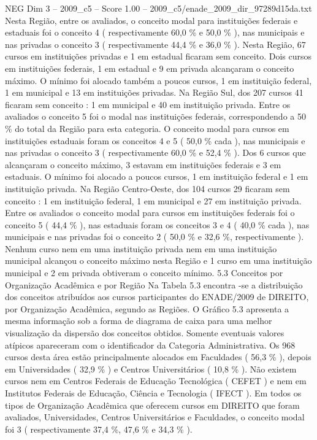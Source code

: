 \begin{textsample}{NEG Dim 3 – 2009\_c5 – Score 1.00 – 2009\_c5/enade\_2009\_dir\_97289d15da.txt}
Nesta Região, entre os avaliados, o conceito modal para instituições federais e estaduais foi o conceito 4 ( respectivamente 60,0 \% e 50,0 \% ), nas municipais e nas privadas o conceito 3 ( respectivamente 44,4 \% e 36,0 \% ).
Nesta Região, 67 cursos em instituições privadas e 1 em estadual ficaram sem conceito.
Dois cursos em instituições federais, 1 em estadual e 9 em privada alcançaram o conceito máximo.
O mínimo foi alocado também a poucos cursos, 1 em instituição federal, 1 em municipal e 13 em instituições privadas.
Na Região Sul, dos 207 cursos 41 ficaram sem conceito : 1 em municipal e 40 em instituição privada.
Entre os avaliados o conceito 5 foi o modal nas instituições federais, correspondendo a 50 \% do total da Região para esta categoria.
O conceito modal para cursos em instituições estaduais foram os conceitos 4 e 5 ( 50,0 \% cada ), nas municipais e nas privadas o conceito 3 ( respectivamente 60,0 \% e 52,4 \% ).
Dos 6 cursos que alcançaram o conceito máximo, 3 estavam em instituições federais e 3 em estaduais.
O mínimo foi alocado a poucos cursos, 1 em instituição federal e 1 em instituição privada.
Na Região Centro-Oeste, dos 104 cursos 29 ficaram sem conceito : 1 em instituição federal, 1 em municipal e 27 em instituição privada.
Entre os avaliados o conceito modal para cursos em instituições federais foi o conceito 5 ( 44,4 \% ), nas estaduais foram os conceitos 3 e 4 ( 40,0 \% cada ), nas municipais e nas privadas foi o conceito 2 ( 50,0 \% e 32,6 \%, respectivamente ).
Nenhum curso nem em uma instituição privada nem em uma instituição municipal alcançou o conceito máximo nesta Região e 1 curso em uma instituição municipal e 2 em privada obtiveram o conceito mínimo. 5.3 Conceitos por Organização Acadêmica e por Região Na Tabela 5.3 encontra -se a distribuição dos conceitos atribuídos aos cursos participantes do ENADE/2009 de DIREITO, por Organização Acadêmica, segundo as Regiões.
O Gráfico 5.3 apresenta a mesma informação sob a forma de diagrama de caixa para uma melhor visualização da dispersão dos conceitos obtidos.
Somente eventuais valores atípicos apareceram com o identificador da Categoria Administrativa.
Os 968 cursos desta área estão principalmente alocados em Faculdades ( 56,3 \% ), depois em Universidades ( 32,9 \% ) e Centros Universitários ( 10,8 \% ).
Não existem cursos nem em Centros Federais de Educação Tecnológica ( CEFET ) e nem em Institutos Federais de Educação, Ciência e Tecnologia ( IFECT ).
Em todos os tipos de Organização Acadêmica que oferecem cursos em DIREITO que foram avaliados, Universidades, Centros Universitários e Faculdades, o conceito modal foi 3 ( respectivamente 37,4 \%, 47,6 \% e 34,3 \% ).

\end{textsample}
